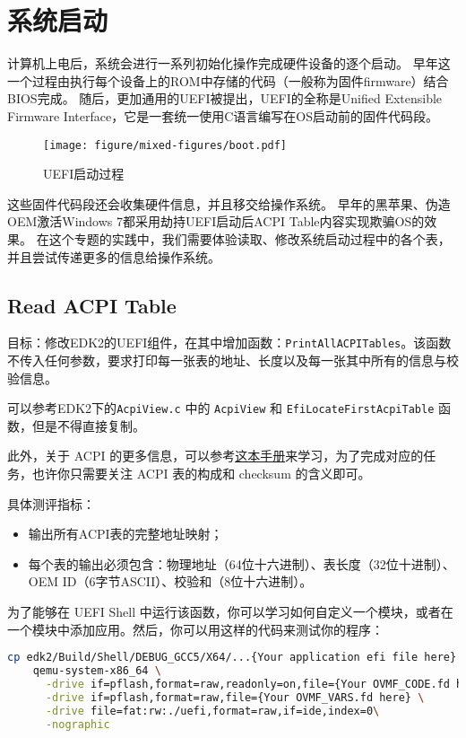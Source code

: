 \chapter{系统启动}
计算机上电后，系统会进行一系列初始化操作完成硬件设备的逐个启动。
早年这一个过程由执行每个设备上的ROM中存储的代码（一般称为固件firmware）结合BIOS完成。
随后，更加通用的UEFI被提出，UEFI的全称是Unified Extensible Firmware Interface，它是一套统一使用C语言编写在OS启动前的固件代码段。

\begin{figure}[h]
    \centering
    \texttt{[image: figure/mixed-figures/boot.pdf]}
    \caption{UEFI启动过程}
    \label{fig:enter-label}
\end{figure}

这些固件代码段还会收集硬件信息，并且移交给操作系统。
早年的黑苹果、伪造OEM激活Windows 7都采用劫持UEFI启动后ACPI Table内容实现欺骗OS的效果。
在这个专题的实践中，我们需要体验读取、修改系统启动过程中的各个表，并且尝试传递更多的信息给操作系统。

\section{Read ACPI Table}
目标：修改EDK2的UEFI组件，在其中增加函数：\texttt{PrintAllACPITables}。该函数不传入任何参数，要求打印每一张表的地址、长度以及每一张其中所有的信息与校验信息。

可以参考EDK2下的\texttt{AcpiView.c} 中的 \texttt{AcpiView} 和 \texttt{EfiLocateFirstAcpiTable} 函数，但是不得直接复制。

此外，关于 ACPI 的更多信息，可以参考\href{https://uefi.org/sites/default/files/resources/ACPI_Spec_6.5a_Final.pdf}{这本手册}来学习，为了完成对应的任务，也许你只需要关注 ACPI 表的构成和 checksum 的含义即可。

具体测评指标：
\begin{itemize}
\item 输出所有ACPI表的完整地址映射；
\item 每个表的输出必须包含：物理地址（64位十六进制）、表长度（32位十进制）、OEM ID（6字节ASCII）、校验和（8位十六进制）。
\end{itemize}

为了能够在 UEFI Shell 中运行该函数，你可以学习如何自定义一个模块，或者在一个模块中添加应用。然后，你可以用这样的代码来测试你的程序：

\begin{lstlisting}[language=bash]
    cp edk2/Build/Shell/DEBUG_GCC5/X64/...{Your application efi file here} ./uefi
    qemu-system-x86_64 \
      -drive if=pflash,format=raw,readonly=on,file={Your OVMF_CODE.fd here} \
      -drive if=pflash,format=raw,file={Your OVMF_VARS.fd here} \
      -drive file=fat:rw:./uefi,format=raw,if=ide,index=0\
      -nographic 
\end{lstlisting}

